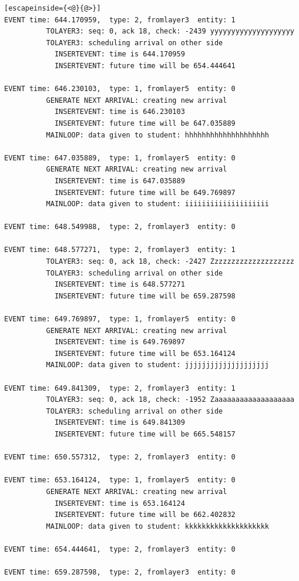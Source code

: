 \documentclass[paper=a4, fontsize=11pt]{scrartcl}
\numberwithin{equation}{section}		%
\numberwithin{figure}{section}			%
\numberwithin{table}{section}				%
\begin{document}
\begin{lstlisting}[escapeinside={<@}{@>}]
EVENT time: 644.170959,  type: 2, fromlayer3  entity: 1
          TOLAYER3: seq: 0, ack 18, check: -2439 yyyyyyyyyyyyyyyyyyyy
          TOLAYER3: scheduling arrival on other side
            INSERTEVENT: time is 644.170959
            INSERTEVENT: future time will be 654.444641

EVENT time: 646.230103,  type: 1, fromlayer5  entity: 0
          GENERATE NEXT ARRIVAL: creating new arrival
            INSERTEVENT: time is 646.230103
            INSERTEVENT: future time will be 647.035889
          MAINLOOP: data given to student: hhhhhhhhhhhhhhhhhhhh

EVENT time: 647.035889,  type: 1, fromlayer5  entity: 0
          GENERATE NEXT ARRIVAL: creating new arrival
            INSERTEVENT: time is 647.035889
            INSERTEVENT: future time will be 649.769897
          MAINLOOP: data given to student: iiiiiiiiiiiiiiiiiiii

EVENT time: 648.549988,  type: 2, fromlayer3  entity: 0

EVENT time: 648.577271,  type: 2, fromlayer3  entity: 1
          TOLAYER3: seq: 0, ack 18, check: -2427 Zzzzzzzzzzzzzzzzzzzz
          TOLAYER3: scheduling arrival on other side
            INSERTEVENT: time is 648.577271
            INSERTEVENT: future time will be 659.287598

EVENT time: 649.769897,  type: 1, fromlayer5  entity: 0
          GENERATE NEXT ARRIVAL: creating new arrival
            INSERTEVENT: time is 649.769897
            INSERTEVENT: future time will be 653.164124
          MAINLOOP: data given to student: jjjjjjjjjjjjjjjjjjjj

EVENT time: 649.841309,  type: 2, fromlayer3  entity: 1
          TOLAYER3: seq: 0, ack 18, check: -1952 Zaaaaaaaaaaaaaaaaaaa
          TOLAYER3: scheduling arrival on other side
            INSERTEVENT: time is 649.841309
            INSERTEVENT: future time will be 665.548157

EVENT time: 650.557312,  type: 2, fromlayer3  entity: 0

EVENT time: 653.164124,  type: 1, fromlayer5  entity: 0
          GENERATE NEXT ARRIVAL: creating new arrival
            INSERTEVENT: time is 653.164124
            INSERTEVENT: future time will be 662.402832
          MAINLOOP: data given to student: kkkkkkkkkkkkkkkkkkkk

EVENT time: 654.444641,  type: 2, fromlayer3  entity: 0

EVENT time: 659.287598,  type: 2, fromlayer3  entity: 0


\end{lstlisting}
\end{document}
